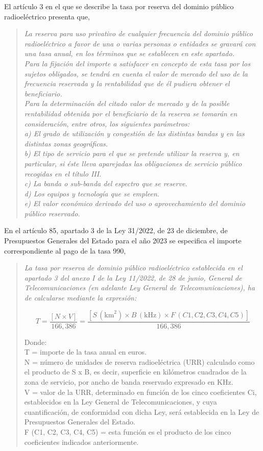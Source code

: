 El artículo 3 en el que se describe la tasa por reserva del dominio público radioeléctrico presenta que,
\begin{quote}
\itshape
La reserva para uso privativo de cualquier frecuencia del dominio público radioeléctrico a favor de una o varias personas o entidades se gravará con una tasa anual, en los términos que se establecen en este apartado.\\
Para la fijación del importe a satisfacer en concepto de esta tasa por los sujetos obligados, se tendrá en cuenta el valor de mercado del uso de la frecuencia reservada y la rentabilidad que de él pudiera obtener el beneficiario.\\
Para la determinación del citado valor de mercado y de la posible rentabilidad obtenida por el beneficiario de la reserva se tomarán en consideración, entre otros, los siguientes parámetros:\\
a) El grado de utilización y congestión de las distintas bandas y en las distintas zonas geográficas.\\
b) El tipo de servicio para el que se pretende utilizar la reserva y, en particular, si éste lleva aparejadas las obligaciones de servicio público recogidas en el título III.\\
c) La banda o sub-banda del espectro que se reserve.\\
d) Los equipos y tecnología que se empleen.\\
e) El valor económico derivado del uso o aprovechamiento del dominio público reservado.
\end{quote}
En el artículo 85, apartado 3 de la Ley 31/2022, de 23 de diciembre, de Presupuestos Generales del Estado para el año 2023 se especifica el importe correspondiente al pago de la tasa 990, \\
\begin{quote}
\itshape
La tasa por reserva de dominio público radioeléctrico establecida en el apartado 3 del anexo I de la Ley 11/2022, de 28 de junio, General de Telecomunicaciones (en adelante Ley General de Telecomunicaciones), ha de calcularse mediante la expresión:

$$T = \frac{[N \times V]}{166,386} = \frac{[S \, (\text{km}^2) \times B \, (\text{kHz}) \times F \, (C1, C2, C3, C4, C5)]}{166,386}$$

Donde:\\
T = importe de la tasa anual en euros.\\
N = número de unidades de reserva radioeléctrica (URR) calculado como el producto de S x B, es decir, superficie en kilómetros cuadrados de la zona de servicio, por ancho de banda reservado expresado en KHz.\\
V = valor de la URR, determinado en función de los cinco coeficientes Ci, establecidos en la Ley General de Telecomunicaciones, y cuya cuantificación, de conformidad con dicha Ley, será establecida en la Ley de Presupuestos Generales del Estado.\\
F (C1, C2, C3, C4, C5) = esta función es el producto de los cinco coeficientes indicados anteriormente.
\end{quote}

